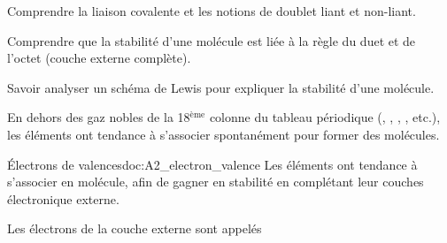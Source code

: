 \teteSndMole



\begin{objectifs}
  \item Comprendre la liaison covalente et les notions de doublet liant et non-liant.
  \item Comprendre que la stabilité d'une molécule est liée à la règle du duet et de l'octet (couche externe complète).
  \item Savoir analyser un schéma de Lewis pour expliquer la stabilité d'une molécule.
\end{objectifs}

\begin{contexte}
  En dehors des gaz nobles de la 18$^\text{ème}$ colonne du tableau périodique (, , , , etc.), les éléments ont tendance à s'associer spontanément pour former des molécules. 
  
\end{contexte}



\begin{doc}{Électrons de valences}{doc:A2_electron_valence}
  Les éléments ont tendance à s'associer en molécule, afin de gagner en stabilité en complétant leur couches électronique externe.  \begin{encart}  
    Les électrons de la couche externe sont appelés 
  \end{encart}  
\end{doc}
  
